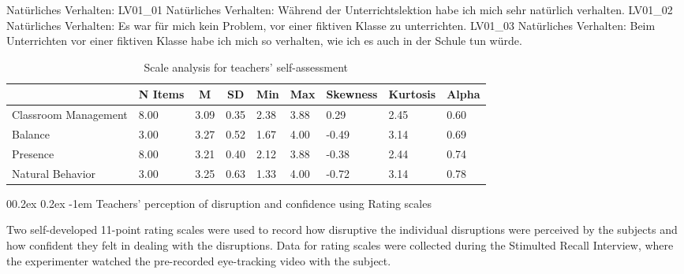 \documentclass[
  man]{apa6}
\makeatletter
\let\oldparagraph\paragraph
\renewcommand{\paragraph}[1]{\oldparagraph{#1}\mbox{}}
\renewcommand{\paragraph}{\@startsection{paragraph}{4}{\parindent}%
  {0\baselineskip \@plus 0.2ex \@minus 0.2ex}%
  {-1em}%
  {\normalfont\normalsize\bfseries\itshape\typesectitle}}
\makeatother
\begin{document}
Natürliches Verhalten:
LV01\_01 Natürliches Verhalten: Während der Unterrichtslektion habe ich mich sehr natürlich verhalten.
LV01\_02 Natürliches Verhalten: Es war für mich kein Problem, vor einer fiktiven Klasse zu unterrichten.
LV01\_03 Natürliches Verhalten: Beim Unterrichten vor einer fiktiven Klasse habe ich mich so verhalten, wie ich es auch in der Schule tun würde.

\begin{table}[h]

\begin{center}
\begin{threeparttable}

\caption{\label{tab:presence_questionnaire}Scale analysis for teachers' self-assessment}

\tiny{

\begin{tabular}{lllllllll}
\toprule
 & \multicolumn{1}{c}{N Items} & \multicolumn{1}{c}{M} & \multicolumn{1}{c}{SD} & \multicolumn{1}{c}{Min} & \multicolumn{1}{c}{Max} & \multicolumn{1}{c}{Skewness} & \multicolumn{1}{c}{Kurtosis} & \multicolumn{1}{c}{Alpha}\\
\midrule
Classroom Management & 8.00 & 3.09 & 0.35 & 2.38 & 3.88 & 0.29 & 2.45 & 0.60\\
Balance & 3.00 & 3.27 & 0.52 & 1.67 & 4.00 & -0.49 & 3.14 & 0.69\\
Presence & 8.00 & 3.21 & 0.40 & 2.12 & 3.88 & -0.38 & 2.44 & 0.74\\
Natural Behavior & 3.00 & 3.25 & 0.63 & 1.33 & 4.00 & -0.72 & 3.14 & 0.78\\
\bottomrule
\end{tabular}

}

\end{threeparttable}
\end{center}

\end{table}

\paragraph{Teachers' perception of disruption and confidence using Rating scales}\label{teachers-perception-of-disruption-and-confidence-using-rating-scales}

Two self-developed 11-point rating scales were used to record how disruptive the individual disruptions were perceived by the subjects and how confident they felt in dealing with the disruptions. Data for rating scales were collected during the Stimulted Recall Interview, where the experimenter watched the pre-recorded eye-tracking video with the subject.
\end{document}
